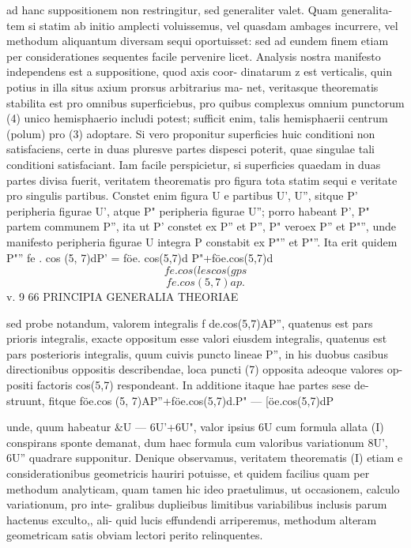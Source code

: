 \documentclass[12pt,a4paper]{article}
\begin{document}
ad hanc suppositionem non restringitur, sed generaliter valet. Quam generalita-
tem si statim ab initio amplecti voluissemus, vel quasdam ambages incurrere, vel
methodum aliquantum diversam sequi oportuisset: sed ad eundem finem etiam
per considerationes sequentes facile pervenire licet.
Analysis nostra manifesto independens est a suppositione, quod axis coor-
dinatarum z est verticalis, quin potius in illa situs axium prorsus arbitrarius ma-
net, veritasque theorematis stabilita est pro omnibus superficiebus, pro quibus
complexus omnium punctorum (4) unico hemisphaerio includi potest; sufficit enim,
talis hemisphaerii centrum (polum) pro (3) adoptare.
Si vero proponitur superficies huic conditioni non satisfaciens, certe in duas
pluresve partes dispesci poterit, quae singulae tali conditioni satisfaciant.    Iam
facile perspicietur, si superficies quaedam in duas partes divisa fuerit, veritatem
theorematis pro figura tota statim sequi e veritate pro singulis partibus.   Constet
enim figura U e partibus U', U'', sitque P' peripheria figurae U', atque P"
peripheria figurae U''; porro habeant P', P" partem communem P'', ita ut P'
constet ex P'' et P'', P" veroex       P'' et P"'', unde manifesto peripheria figurae
U integra P constabit ex P"'' et P"''.          Ita erit quidem
P"''
fe .
cos (5, 7)dP' = föe. cos(5,7)d P"+föe.cos(5,7)d
\[                                fe. cos ( les                   cos (gps\]
\[          fe .cos (5, 7) ap.\]
v.                                                                   9
66                                PRINCIPIA GENERALIA THEORIAE

sed probe notandum, valorem integralis f de.cos(5,7)AP'', quatenus est pars
prioris integralis, exacte oppositum esse valori eiusdem integralis, quatenus est
pars posterioris integralis, quum cuivis puncto lineae P'', in his duobus casibus
directionibus oppositis describendae,          loca puncti (7) opposita adeoque valores op-
positi factoris     cos(5,7)    respondeant.     In additione itaque hae partes sese de-
struunt, fitque
föe.cos (5, 7)AP''+föe.cos(5,7)d.P" --- [öe.cos(5,7)dP

unde, quum habeatur \&U --- 6U'+6U", valor ipsius 6U cum formula allata
(I) conspirans sponte demanat, dum haec formula cum valoribus variationum
8U', 6U'' quadrare supponitur.
Denique observamus, veritatem theorematis (I) etiam e considerationibus
geometricis hauriri potuisse, et quidem facilius quam per methodum analyticam,
quam tamen hic ideo praetulimus, ut occasionem, calculo variationum, pro inte-
gralibus duplieibus limitibus variabilibus inclusis parum hactenus exculto,, ali-
quid lucis effundendi arriperemus, methodum alteram geometricam satis obviam
lectori perito relinquentes.
\end{document}
